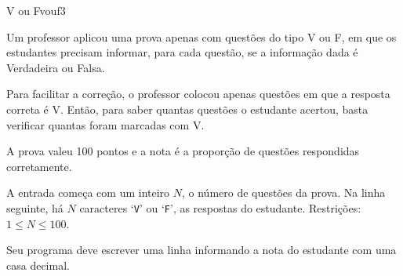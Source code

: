 \documentclass[12pt,a4paper,oneside]{article}
\begin{document}
\begin{problem}{V ou F}{vouf}{3}

Um professor aplicou uma prova apenas com questões do tipo V ou F, em que os estudantes precisam informar, para cada questão, se a informação dada é Verdadeira ou Falsa.

Para facilitar a correção, o professor colocou apenas questões em que a resposta correta é V. Então, para saber quantas questões o estudante acertou, basta verificar quantas foram marcadas com V.

A prova valeu 100 pontos e a nota é a proporção de questões respondidas corretamente.

%

\InputFile

A entrada começa com um inteiro $N$, o número de questões da prova. Na linha seguinte, há $N$ caracteres `\texttt{V}' ou `\texttt{F}', as respostas do estudante. Restrições: $1 \leq N \leq 100$.


\OutputFile

Seu programa deve escrever uma linha informando a nota do estudante com uma casa decimal.


\Example

\begin{example}
%
\end{example}

\begin{example}
%
\end{example}

\begin{example}
%
\end{example}



\end{problem}
\end{document}
